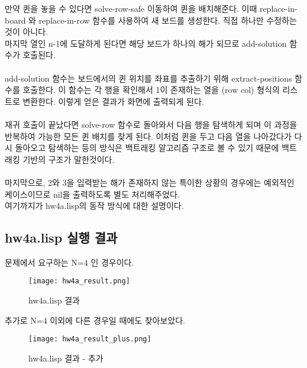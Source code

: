 \documentclass{article}
\begin{document}
만약 퀸을 놓을 수 있다면 solve-row-safe 이동하여 퀸을 배치해준다. 이때 replace-in-board 와 replace-in-row 함수를 사용하여 새 보드를 생성한다. 직접 하나만 수정하는 것이 아니다. \\
마지막 열인 n-1에 도달하게 된다면 해당 보드가 하나의 해가 되므로 add-solution 함수가 호출된다.\\ \\ 

add-solution 함수는 보드에서의 퀸 위치를 좌표를 추출하기 위해 extract-positions 함수를 호출한다. 이 함수는 각 행을 확인해서 1이 존재하는 열을 (row col) 형식의 리스트로 변환한다. 이렇게 얻은 결과가 화면에 출력되게 된다. \\ \\

재귀 호출이 끝났다면 solve-row 함수로 돌아와서 다음 행을 탐색하게 되며 이 과정을 반복하여 가능한 모든 퀸 배치를 찾게 된다. 이처럼 퀸을 두고 다음 열을 나아갔다가 다시 돌아오고 탐색하는 등의 방식은 백트래킹 알고리즘 구조로 볼 수 있기 때문에 백트래킹 기반의 구조가 말한것이다. \\ \\

마지막으로, 2와 3을 입력받는 해가 존재하지 않는 특이한 상황의 경우에는 예외적인 케이스이므로 nil을 출력하도록 별도 처리해주었다. \\
여기까지가 hw4a.lisp의 동작 방식에 대한 설명이다.

\newpage

\subsection{hw4a.lisp 실행 결과}

문제에서 요구하는 N=4 인 경우이다. \\

\begin{figure}[H]
    \centering
    \texttt{[image: hw4a\_result.png]}
    \caption{hw4a.lisp 결과}
    \label{fig:enter-label}
\end{figure}

\newpage


추가로 N=4 이외에 다른 경우일 때에도 찾아보았다. 

\begin{figure}[H]
    \centering
    \texttt{[image: hw4a\_result\_plus.png]}
    \caption{hw4a.lisp 결과 - 추가}
    \label{fig:enter-label}
\end{figure}

\newpage
\end{document}
